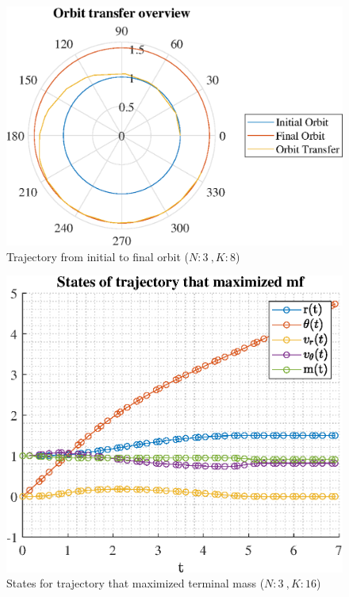 \documentclass[]{article}
\begin{document}
	\begin{figure}
		\centering
		\includegraphics[scale=0.75]{orbit_N3_K8_C3_mf.eps}
		\caption{Trajectory from initial to final orbit (\(N:3\ , K:8\))}
		\label{fig:orbit_N3_K8_C3_mf}
	\end{figure}
	\begin{figure}
		\centering
		\includegraphics[scale=0.75]{states_N3_K16_C3_mf.eps}
		\caption{States for trajectory that maximized terminal mass (\(N:3\ , K:16\))}
		\label{fig:states_N3_K16_C3_mf}
	\end{figure}
\end{document}
